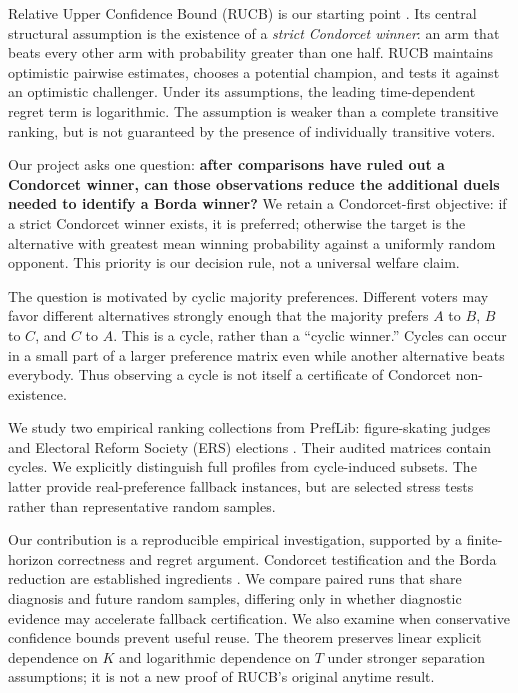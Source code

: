 \documentclass[11pt,a4paper]{article}
\begin{document}
Relative Upper Confidence Bound (RUCB) is our starting point \cite{rucb}. Its central structural assumption is the existence of a \emph{strict Condorcet winner}: an arm that beats every other arm with probability greater than one half. RUCB maintains optimistic pairwise estimates, chooses a potential champion, and tests it against an optimistic challenger. Under its assumptions, the leading time-dependent regret term is logarithmic. The assumption is weaker than a complete transitive ranking, but is not guaranteed by the presence of individually transitive voters.

Our project asks one question: \textbf{after comparisons have ruled out a Condorcet winner, can those observations reduce the additional duels needed to identify a Borda winner?} We retain a Condorcet-first objective: if a strict Condorcet winner exists, it is preferred; otherwise the target is the alternative with greatest mean winning probability against a uniformly random opponent. This priority is our decision rule, not a universal welfare claim.

The question is motivated by cyclic majority preferences. Different voters may favor different alternatives strongly enough that the majority prefers $A$ to $B$, $B$ to $C$, and $C$ to $A$. This is a cycle, rather than a ``cyclic winner.'' Cycles can occur in a small part of a larger preference matrix even while another alternative beats everybody. Thus observing a cycle is not itself a certificate of Condorcet non-existence.

We study two empirical ranking collections from PrefLib: figure-skating judges and Electoral Reform Society (ERS) elections \cite{preflib,skate,ers}. Their audited matrices contain cycles. We explicitly distinguish full profiles from cycle-induced subsets. The latter provide real-preference fallback instances, but are selected stress tests rather than representative random samples.

Our contribution is a reproducible empirical investigation, supported by a finite-horizon correctness and regret argument. Condorcet testification and the Borda reduction are established ingredients \cite{test,sparse}. We compare paired runs that share diagnosis and future random samples, differing only in whether diagnostic evidence may accelerate fallback certification. We also examine when conservative confidence bounds prevent useful reuse. The theorem preserves linear explicit dependence on $K$ and logarithmic dependence on $T$ under stronger separation assumptions; it is not a new proof of RUCB's original anytime result.
\end{document}
